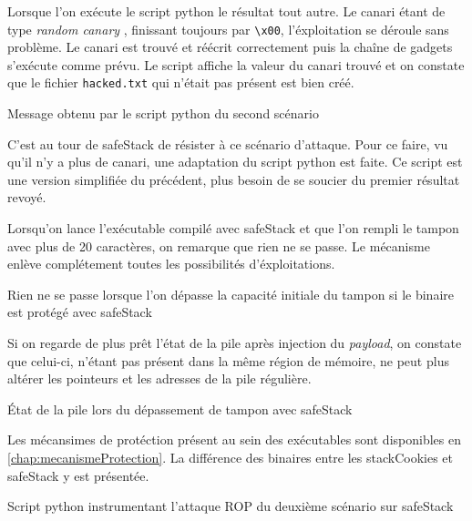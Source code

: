 Lorsque l'on exécute le script python le résultat tout autre. Le canari étant de type
\og \textit{random canary} \fg, finissant toujours par \texttt{\textbackslash x00},
l'éxploitation se déroule sans problème. Le canari est trouvé et réécrit correctement
puis la chaîne de gadgets s'exécute comme prévu. Le script affiche la valeur du canari
trouvé et on constate que le fichier \texttt{hacked.txt} qui n'était pas présent est
bien créé.

\begin{listing}
	\caption{Message obtenu par le script python du second scénario}
	\label{lst:powned}
\end{listing}

C'est au tour de \og \gls{safeStack} \fg de résister à ce scénario d'attaque.
Pour ce faire, vu qu'il n'y a plus de canari, une adaptation du script
python est faite. Ce script est une version simplifiée du précédent, plus besoin de se
soucier du premier résultat revoyé.

Lorsqu'on lance l'exécutable compilé avec \og \gls{safeStack} \fg et que l'on rempli
le tampon avec plus de 20 caractères, on remarque que rien ne se passe. Le mécanisme enlève complétement toutes les possibilités d'éxploitations.

\begin{listing}
	\caption{Rien ne se passe lorsque l'on dépasse la capacité initiale du tampon si le binaire est protégé avec \og \gls{safeStack} \fg}
	\label{lst:attackSafeStack}
\end{listing}

Si on regarde de plus prêt l'état de la pile après injection du \textit{payload}, on
constate que celui-ci, n'étant pas présent dans la même région de mémoire, ne peut
plus altérer les pointeurs et les adresses de la pile régulière.

\begin{listing}
	\caption{État de la pile lors du dépassement de tampon avec \og \gls{safeStack} \fg}
	\label{lst:stackSS}
\end{listing}

Les mécansimes de protéction présent au sein des exécutables sont disponibles en \autoref{chap:mecanismeProtection}. La différence des binaires entre les \og \gls{stackCookies} \fg et \og \gls{safeStack} \fg y est présentée.

\begin{listing}
	\caption{Script python instrumentant l'attaque ROP du deuxième scénario sur \og \gls{safeStack} \fg}
	\label{lst:exploit2}
\end{listing}

